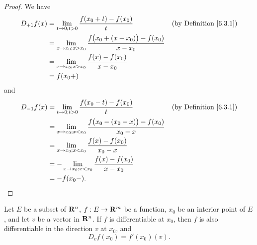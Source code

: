 \begin{proof}
    We have
    \begin{align*}
        D_{+1} f(x) & = \lim_{t \to 0 ; t > 0} \frac{f(x_0 + t) - f(x_0)}{t}                           & \text{(by Definition \ref{6.3.1})} \\
                    & = \lim_{x \to x_0 ; x > x_0} \frac{f\big(x_0 + (x - x_0)\big) - f(x_0)}{x - x_0}                                      \\
                    & = \lim_{x \to x_0 ; x > x_0} \frac{f(x) - f(x_0)}{x - x_0}                                                            \\
                    & = f(x_0+)
    \end{align*}
    and
    \begin{align*}
        D_{-1} f(x) & = \lim_{t \to 0 ; t > 0} \frac{f(x_0 - t) - f(x_0)}{t}                           & \text{(by Definition \ref{6.3.1})} \\
                    & = \lim_{x \to x_0 ; x < x_0} \frac{f\big(x_0 - (x_0 - x)\big) - f(x_0)}{x_0 - x}                                      \\
                    & = \lim_{x \to x_0 ; x < x_0} \frac{f(x) - f(x_0)}{x_0 - x}                                                            \\
                    & = -\lim_{x \to x_0 ; x < x_0} \frac{f(x) - f(x_0)}{x - x_0}                                                           \\
                    & = -f(x_0-).
    \end{align*}
\end{proof}

\setcounter{theorem}{4}
\begin{lemma}\label{6.3.5}
    Let \(E\) be a subset of \(\mathbf{R}^n\), \(f : E \to \mathbf{R}^m\) be a function, \(x_0\) be an interior point of \(E\), and let \(v\) be a vector in \(\mathbf{R}^n\).
    If \(f\) is differentiable at \(x_0\), then \(f\) is also differentiable in the direction \(v\) at \(x_0\), and
    \[
        D_v f(x_0) = f'(x_0)(v).
    \]
\end{lemma}

